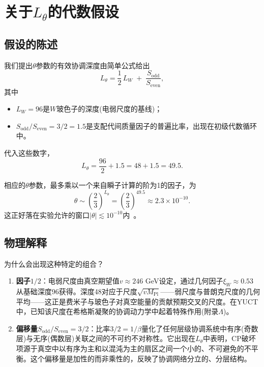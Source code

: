 \documentclass[12pt,a4paper]{article}
\begin{document}
	\section{关于\(L_\theta\)的代数假设}
	\label{sec:hypothesis}
	
	\subsection{假设的陈述}
	
	我们提出\(\theta\)参数的有效协调深度由简单公式给出
	\begin{equation}
		\boxed{L_\theta = \frac{1}{2}\,L_W \;+\; \frac{S_{\mathrm{odd}}}{S_{\mathrm{even}}}},
		\label{eq:Ltheta}
	\end{equation}
	其中
	\begin{itemize}
		\item \(L_W = 96\)是\(W\)玻色子的深度(电弱尺度的基线)；
		\item \(S_{\mathrm{odd}}/S_{\mathrm{even}} = 3/2 = 1.5\)是支配代间质量因子的普遍比率，出现在初级代数循环中。
	\end{itemize}
	
	代入这些数字，
	\[
	L_\theta = \frac{96}{2} + 1.5 = 48 + 1.5 = 49.5.
	\]
	
	相应的\(\theta\)参数，最多乘以一个来自瞬子计算的阶为1的因子，为
	\[
	\theta \sim \left(\frac{2}{3}\right)^{L_\theta} = \left(\frac{2}{3}\right)^{49.5} \approx 2.3 \times 10^{-10}.
	\]
	这正好落在实验允许的窗口\(|\theta| \lesssim 10^{-10}\)内~\cite{nEDM2020}。
	
	\subsection{物理解释}
	
	为什么会出现这种特定的组合？
	\begin{enumerate}
		\item \textbf{因子\(1/2\)}：电弱尺度由真空期望值\(v \approx 246\) GeV设定，通过几何因子\(\xi_W \approx 0.53\)从基础深度96获得。深度48对应于尺度\(\sqrt{v M_{\mathrm{Pl}}}\)——弱尺度与普朗克尺度的几何平均——这正是费米子与玻色子对真空能量的贡献预期交叉的尺度。在YUCT中，已知该尺度在希格斯凝聚的协调动力学中起着特殊作用(附录\(\Lambda\))。
		\item \textbf{偏移量\(S_{\mathrm{odd}}/S_{\mathrm{even}} = 3/2\)}：比率\(3/2 = 1/\beta\)量化了任何层级协调系统中有序(奇数层)与无序(偶数层)关联之间的不可约不对称性。它出现在\(L_\theta\)中表明，CP破坏项源于真空中以有序为主和以混沌为主的扇区之间一个小的、不可避免的不平衡。这个偏移量是加性的而非乘性的，反映了协调网络分立的、分层结构。
	\end{enumerate}
	
\end{document}

